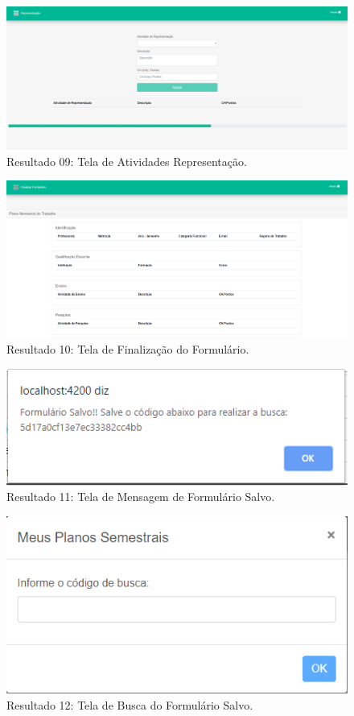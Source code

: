 \begin{figure}[htb]
    \centering
    \includegraphics[width=.8\textwidth]{img/pagina_representacao.PNG}
    \caption[Resultado 09: Tela de Atividades Representação]{Resultado 09: Tela de Atividades Representação.}
    \label{fig:result09}
\end{figure}

\begin{figure}[htb]
    \centering
    \includegraphics[width=.8\textwidth]{img/pagina_finalizar.PNG}
    \caption[Resultado 10: Tela de Finalização do Formulário]{Resultado 10: Tela de Finalização do Formulário.}
    \label{fig:result10}
\end{figure}

\begin{figure}[htb]
    \centering
    \includegraphics[width=.8\textwidth]{img/alert_salvar.PNG}
    \caption[Resultado 11: Tela de Mensagem de Formulário Salvo]{Resultado 11: Tela de Mensagem de Formulário Salvo.}
    \label{fig:result11}
\end{figure}

\begin{figure}[htb]
    \centering
    \includegraphics[width=.8\textwidth]{img/pagina_busca.PNG}
    \caption[Resultado 12: Tela de Busca do Formulário Salvo]{Resultado 12: Tela de Busca do Formulário Salvo.}
    \label{fig:result12}
\end{figure}


